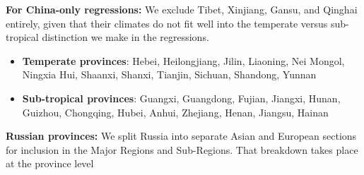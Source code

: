\documentclass[11pt]{article}
\begin{document}
\noindent\textbf{For China-only regressions:} We exclude Tibet, Xinjiang, Gansu, and Qinghai entirely, given that their climates do not fit well into the temperate versus sub-tropical distinction we make in the regressions.
\begin{itemize}
	\setlength\itemsep{0pt}
	\item \textbf{Temperate provinces}: Hebei, Heilongjiang, Jilin, Liaoning, Nei Mongol, Ningxia Hui, Shaanxi, Shanxi, Tianjin, Sichuan, Shandong, Yunnan
	\item \textbf{Sub-tropical provinces}: Guangxi, Guangdong, Fujian, Jiangxi, Hunan, Guizhou, Chongqing, Hubei, Anhui, Zhejiang, Henan, Jiangsu, Hainan
\end{itemize}

\noindent\textbf{Russian provinces:} We split Russia into separate Asian and European sections for inclusion in the Major Regions and Sub-Regions. That breakdown takes place at the province level
\begin{itemize}
    \setlength\itemsep{0pt}
    
\end{itemize}

\clearpage

\onehalfspacing
{\small


}

\clearpage
\end{document}
